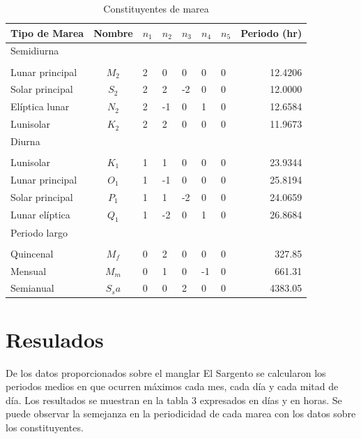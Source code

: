 \documentclass[paper=letter, fontsize=12pt,spanish]{article}
\begin{document}
\begin{table}[ht!]
\centering 

\begin{tabular}{l c l l l l l r}
\toprule
Tipo de Marea & Nombre & $n_1$ & $n_2$ & $n_3$ & $n_4$ & $n_5$ & Periodo (hr)\\
\midrule
Semidiurna & & & & & & & \\ \\
Lunar principal & $M_2$ & 2 & 0 & 0 & 0 & 0 & 12.4206\\
Solar principal & $S_2$ & 2 & 2 & -2 & 0 & 0 & 12.0000\\
Elíptica lunar & $N_2$ & 2 & -1 & 0 & 1 & 0 & 12.6584\\
Lunisolar & $K_2$ & 2 & 2 & 0 & 0 & 0 & 11.9673\\
\midrule
Diurna & & & & & & &\\ \\
Lunisolar & $K_1$ & 1 & 1 & 0 & 0 & 0 & 23.9344\\
Lunar principal & $O_1$ & 1 & -1 & 0 & 0 & 0 & 25.8194\\
Solar principal & $P_1$ & 1 & 1 & -2 & 0 & 0 & 24.0659\\
Lunar elíptica & $Q_1$ & 1 & -2 & 0 & 1 & 0 & 26.8684 \\
\midrule
Periodo largo & & & & & & & \\ \\ 
Quincenal & $M_f$ & 0 & 2 & 0 & 0 & 0 & 327.85\\
Mensual & $M_m$ & 0 & 1 & 0 & -1 & 0 & 661.31 \\
Semianual & $S_sa$ & 0 & 0 & 2 & 0 & 0 & 4383.05 \\
      
\bottomrule 

 \end{tabular}
\caption {Constituyentes de marea} \label{tab:title} 
\end{table}

\section{Resulados}
De los datos proporcionados sobre el manglar El Sargento se calcularon los periodos medios en que ocurren máximos cada mes, cada día y cada mitad de día. Los resultados se muestran en la tabla 3 expresados en días y en horas. Se puede observar la semejanza en la periodicidad de cada marea con los datos sobre los constituyentes.
\end{document}
